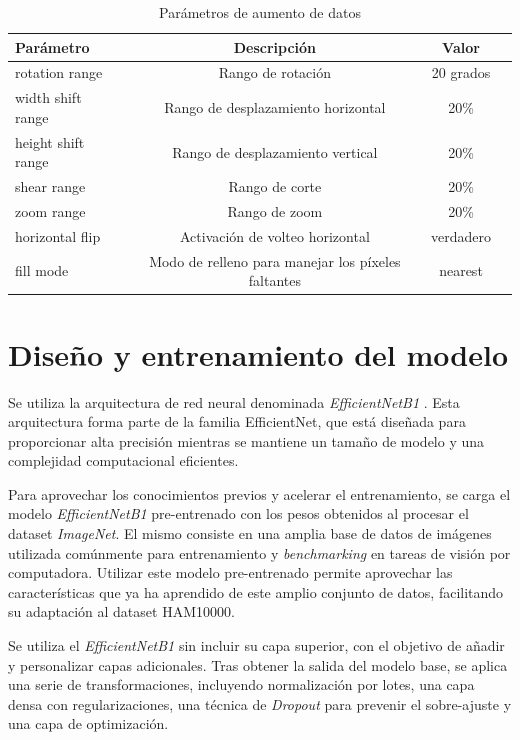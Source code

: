 \begin{table}[ht]
   \centering
   \begin{tabular}{lccc}
   \hline
   Parámetro & Descripción  & Valor \\ \hline
   rotation range & 	Rango de rotación & 20 grados \\
   width shift range & Rango de desplazamiento horizontal & 20\% \\
   height shift range & Rango de desplazamiento vertical & 20\% \\
   shear range & 	Rango de corte & 20\% \\
   zoom range & Rango de zoom & 20\% \\
   horizontal flip & Activación de volteo horizontal & verdadero \\
   fill mode & Modo de relleno para manejar los píxeles faltantes & nearest \\ \hline
   \end{tabular}
   \caption{Parámetros de aumento de datos}
   \label{tab:data_augmentation_params}
   \end{table}

\section{Diseño y entrenamiento del modelo}

Se utiliza la arquitectura de red neural denominada \textit{EfficientNetB1} . Esta arquitectura forma parte de la familia EfficientNet, que está diseñada para proporcionar alta precisión mientras se mantiene un tamaño de modelo y una complejidad computacional eficientes.

Para aprovechar los conocimientos previos y acelerar el entrenamiento, se carga el modelo \textit{EfficientNetB1} pre-entrenado con los pesos obtenidos al procesar el dataset \textit{ImageNet}. El mismo consiste en una amplia base de datos de imágenes utilizada comúnmente para entrenamiento y \textit{benchmarking} en tareas de visión por computadora. Utilizar este modelo pre-entrenado permite aprovechar las características que ya ha aprendido de este amplio conjunto de datos, facilitando su adaptación al dataset HAM10000.

Se utiliza el \textit{EfficientNetB1} sin incluir su capa superior, con el objetivo de añadir y personalizar capas adicionales. Tras obtener la salida del modelo base, se aplica una serie de transformaciones, incluyendo normalización por lotes, una capa densa con regularizaciones, una técnica de \textit{Dropout} para prevenir el sobre-ajuste y una capa de optimización. 

